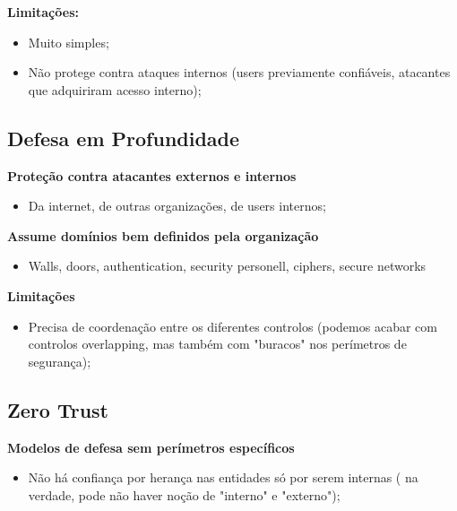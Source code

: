 \documentclass{article}
\begin{document}
\begin{flushleft}
\begin{flushleft}
    \vspace{2mm}

    \textbf{Limitações:}
    \begin{itemize}
      \item Muito simples;
      \item Não protege contra ataques internos (users previamente confiáveis,
      atacantes que adquiriram acesso interno);
    \end{itemize}
  \end{flushleft}

  \subsection{Defesa em Profundidade}

  \begin{flushleft}
    \textbf{Proteção contra atacantes externos e internos}
    \begin{itemize}
      \item Da internet, de outras organizações, de users internos;
    \end{itemize}

    \textbf{Assume domínios bem definidos pela organização}
    \begin{itemize}
      \item Walls, doors, authentication, security personell, ciphers, secure networks
    \end{itemize}

    \textbf{Limitações}
    \begin{itemize}
      \item Precisa de coordenação entre os diferentes controlos (podemos acabar
      com controlos overlapping, mas também com "buracos" nos perímetros de segurança);
    \end{itemize}
  \end{flushleft}

  \pagebreak

  \subsection{Zero Trust}

  \begin{flushleft}
    \textbf{Modelos de defesa sem perímetros específicos}
    \begin{itemize}
      \item Não há confiança por herança nas entidades só por serem internas (
        na verdade, pode não haver noção de "interno" e "externo");
    \end{itemize}


\end{flushleft}
\end{flushleft}
\end{document}
